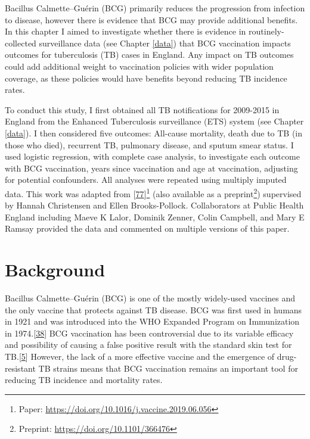 \documentclass[11pt,twoside]{bristolthesis}
\begin{document}
  Bacillus Calmette--Guérin (BCG) primarily reduces the progression from infection to disease, however there is evidence that BCG may provide additional benefits. In this chapter I aimed to investigate whether there is evidence in routinely-collected surveillance data (see Chapter \ref{data}) that BCG vaccination impacts outcomes for tuberculosis (TB) cases in England. Any impact on TB outcomes could add additional weight to vaccination policies with wider population coverage, as these policies would have benefits beyond reducing TB incidence rates.
  
  To conduct this study, I first obtained all TB notifications for 2009-2015 in England from the Enhanced Tuberculosis surveillance (ETS) system (see Chapter \ref{data}). I then considered five outcomes: All-cause mortality, death due to TB (in those who died), recurrent TB, pulmonary disease, and sputum smear status. I used logistic regression, with complete case analysis, to investigate each outcome with BCG vaccination, years since vaccination and age at vaccination, adjusting for potential confounders. All analyses were repeated using multiply imputed data. This work was adapted from {[}\protect\hyperlink{ref-Abbott:2019ir}{77}{]}\footnote{Paper: \url{https://doi.org/10.1016/j.vaccine.2019.06.056}} (also available as a preprint\footnote{Preprint: \url{https://doi.org/10.1101/366476}}) supervised by Hannah Christensen and Ellen Brooks-Pollock. Collaborators at Public Health England including Maeve K Lalor, Dominik Zenner, Colin Campbell, and Mary E Ramsay provided the data and commented on multiple versions of this paper.
  
  \hypertarget{background-4}{%
  \section{Background}\label{background-4}}
  
  Bacillus Calmette--Guérin (BCG) is one of the mostly widely-used vaccines and the only vaccine that protects against TB disease. BCG was first used in humans in 1921 and was introduced into the WHO Expanded Program on Immunization in 1974.{[}\protect\hyperlink{ref-The2004}{38}{]} BCG vaccination has been controversial due to its variable efficacy and possibility of causing a false positive result with the standard skin test for TB.{[}\protect\hyperlink{ref-Zwerling2011a}{5}{]} However, the lack of a more effective vaccine and the emergence of drug-resistant TB strains means that BCG vaccination remains an important tool for reducing TB incidence and mortality rates.
  
\end{document}
